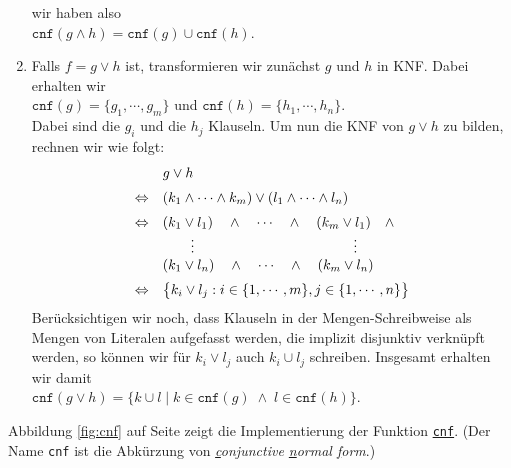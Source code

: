 \begin{enumerate}
      wir haben also \\[0.2cm]
      \hspace*{1.3cm} $\texttt{cnf}(g \wedge h) = \texttt{cnf}(g) \cup  \texttt{cnf}(h)$.
\item Falls $f = g \vee h$ ist, transformieren wir zunächst $g$ und $h$ in KNF.
      Dabei erhalten wir \\[0.2cm]
      \hspace*{1.3cm} 
      $\texttt{cnf}(g) = \{ g_1, \cdots, g_m \}$ \quad und \quad
      $\texttt{cnf}(h) = \{ h_1, \cdots, h_n \}$. \\[0.2cm]
      Dabei sind die $g_i$ und die $h_j$ Klauseln.  Um nun die KNF von $g \vee h$ zu
      bilden, rechnen wir wie folgt: 
      $$
      \begin{array}[c]{ll}
        & g \vee h  \\[0.2cm]
      \Leftrightarrow & (k_1 \wedge \cdots \wedge k_m) \vee (l_1 \wedge \cdots \wedge l_n) \\[0.2cm]
      \Leftrightarrow & (k_1 \vee l_1) \quad \wedge \quad \cdots \quad \wedge \quad (k_m \vee l_1) \quad \wedge \\ 
                      & \qquad \vdots     \hspace*{4cm} \vdots                \\
                      & (k_1 \vee l_n) \quad \wedge \quad \cdots \quad \wedge \quad (k_m \vee l_n) \\[0.2cm] 
      \Leftrightarrow & \bigl\{ k_i \vee l_j : i \in \{ 1, \cdots, m\}, j \in \{ 1, \cdots, n \} \bigr\} \\ 
      \end{array}
      $$
      Berücksichtigen wir noch, dass Klauseln in der Mengen-Schreibweise als Mengen von
      Literalen aufgefasst werden, die implizit disjunktiv verknüpft werden, so können wir
      für $k_i \vee l_j$ auch $k_i \cup l_j$ schreiben.  
      Insgesamt erhalten wir damit 
      \\[0.2cm]
      \hspace*{1.3cm} 
      $\texttt{cnf}(g \vee h) = \bigl\{ k \cup l \mid k \in \texttt{cnf}(g) \;\wedge\; l \in \texttt{cnf}(h) \bigr\}$.
\end{enumerate}
Abbildung \ref{fig:cnf} auf Seite \pageref{fig:cnf} zeigt die Implementierung der Funktion
\href{https://github.com/karlstroetmann/Logic/blob/master/Python/CNF.ipynb}{\texttt{cnf}}.
(Der Name \texttt{cnf} ist die Abkürzung von \emph{\underline{c}onjunctive \underline{n}ormal \underline{f}orm}.)

